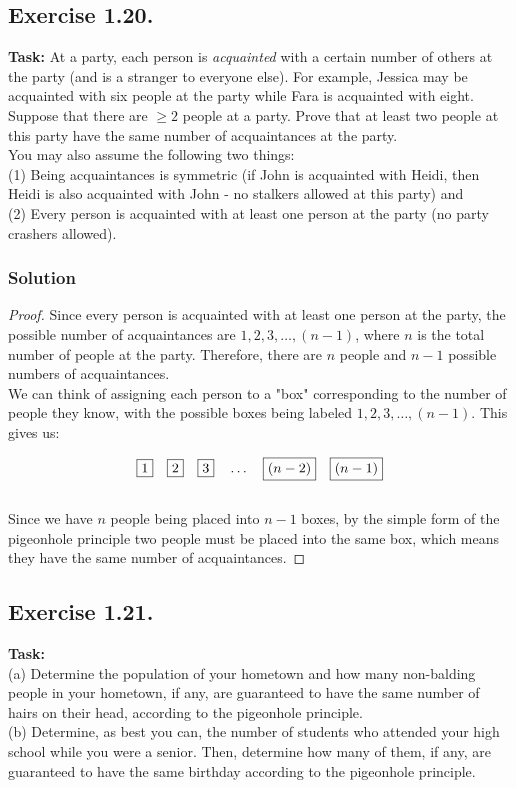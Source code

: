 \documentclass{article}
\begin{document}
\newpage

\subsection{Exercise 1.20.} 
\textbf{Task:} At a party, each person is \textit{acquainted} with a certain number of others at the party (and is a stranger to everyone else). For example, Jessica may be acquainted with six people at the party while Fara is acquainted with eight. Suppose that there are $\geq 2$ people at a party. Prove that at least two people at this party have the same number of acquaintances at the party. \\
You may also assume the following two things: \\
(1) Being acquaintances is symmetric (if John is acquainted with Heidi, then Heidi is also acquainted with John - no stalkers allowed at this party) and\\
(2) Every person is acquainted with at least one person at the party (no party crashers allowed).

\subsubsection*{Solution} 

\begin{proof} 
    Since every person is acquainted with at least one person at the party, the possible number of acquaintances are $1,2,3,\dots,(n-1)$, where $n$ is the total number of people at the party. Therefore, there are $n$ people and $n-1$ possible numbers of acquaintances.\\
    We can think of assigning each person to a "box" corresponding to the number of people they know, with the possible boxes being labeled $1,2,3,\dots,(n-1)$. This gives us:

    \[
    \fbox{1} \quad \fbox{2} \quad \fbox{3} \quad \dots \quad \fbox{$(n-2)$} \quad \fbox{$(n-1)$}
    \]\\

   Since we have $n$ people being placed into $n-1$ boxes, by the simple form of the pigeonhole principle two people must be placed into the same box, which means they have the same number of acquaintances.

\end{proof}

\newpage

\subsection{Exercise 1.21.} 
\textbf{Task:} \\(a) Determine the population of your hometown and how many non-balding people in your hometown, if any, are guaranteed to have the same number of hairs on their head, according to the pigeonhole principle. \\
(b) Determine, as best you can, the number of students who attended your high school while you were a senior. Then, determine how many of them, if any, are guaranteed to have the same birthday according to the pigeonhole principle.
\end{document}
